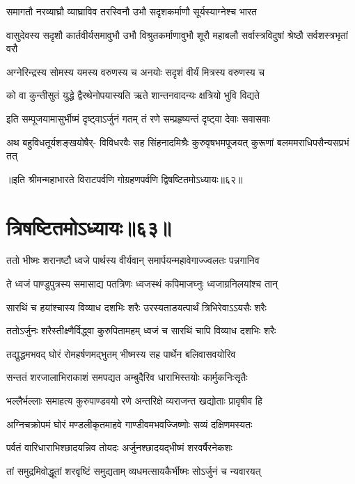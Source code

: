\twolineshloka
{समागतौ नरव्याघ्रौ व्याघ्राविव तरस्विनौ}
{उभौ सदृशकर्माणौ सूर्यस्याग्नेश्च भारत}


\threelineshloka
{वासुदेवस्य सदृशौ कार्तवीर्यसमावुभौ}
{उभौ विश्रुतकर्माणावुभौ शूरौ महाबलौ}
{सर्वास्त्रविदुषां श्रेष्ठौ सर्वशस्त्रभृतां वरौ}


\twolineshloka
{अग्नेरिन्द्रस्य सोमस्य यमस्य वरुणस्य च}
{अनयोः सदृशं वीर्यं मित्रस्य वरुणस्य च}


\twolineshloka
{को वा कुन्तीसुतं युद्धे द्वैरथेनोपयास्यति}
{ऋते शान्तनवादन्यः क्षत्रियो भुवि विद्यते}


\twolineshloka
{इति सम्पूजयामासुर्भीष्मं दृष्ट्वाऽर्जुनं गतम्}
{तं रणे सम्प्रहृष्यन्तं दृष्ट्वा देवाः सवासवाः}


\fourlineindentedshloka
{अथ बहुविधतूर्यशङ्खयोषैर्-}
{विविधरवैः सह सिंहनादमिश्रैः}
{कुरुवृषभमपूजयत् कुरूणां}
{बलममराधिपसैन्यसप्रभं तत्}

॥इति श्रीमन्महाभारते विराटपर्वणि गोग्रहणपर्वणि द्विषष्टितमोऽध्यायः॥६२॥

\chapter{त्रिषष्टितमोऽध्यायः॥६३॥}

\twolineshloka
{ततो भीष्मः शरानष्टौ ध्वजे पार्थस्य वीर्यवान्}
{समार्पयन्महावेगाज्ज्वलतः पन्नगानिव}


\twolineshloka
{ते ध्वजं पाण्डुपुत्रस्य समासाद्य पतत्रिणः}
{ध्वजस्थं कपिमाजघ्नुः ध्वजाग्रनिलयांश्च तान्}


\twolineshloka
{सारथिं च हयांश्चास्य विव्याध दशभिः शरैः}
{उरस्यताडयत्पार्थं त्रिभिरेवाऽऽयसैः शरैः}


\twolineshloka
{ततोऽर्जुनः शरैस्तीक्ष्णैर्विद्ध्वा कुरुपितामहम्}
{ध्वजं च सारथिं चापि विव्याध दशभिः शरैः}


\twolineshloka
{तद्युद्धमभवद् घोरं रोमहर्षणमद्भुतम्}
{भीष्मस्य सह पार्थेन बलिवासवयोरिव}


\twolineshloka
{सन्ततं शरजालाभिराकाशं समपद्यत}
{अम्बुदैरिव धाराभिस्तयोः कार्मुकनिःसृतैः}


\twolineshloka
{भल्लैर्भल्लाः समाहत्य कुरुपाण्डवयो रणे}
{अन्तरिक्षे व्यराजन्त खद्योताः प्रावृषीव हि}


\twolineshloka
{अग्निचक्रोपमं घोरं मण्डलीकृतमाहवे}
{गाण्डीवमभवज्जिष्णोः सव्यं दक्षिणमस्यतः}


\twolineshloka
{पर्वतं वारिधाराभिश्छादयन्निव तोयदः}
{अर्जुनश्छादयद्भीष्मं शरवर्षैरनेकशः}


\twolineshloka
{तां समुद्रमिवोद्धूतां शरवृष्टिं समुद्यताम्}
{व्यधमत्सायकैर्भीष्मः सोऽर्जुनं च न्यवारयत्}


